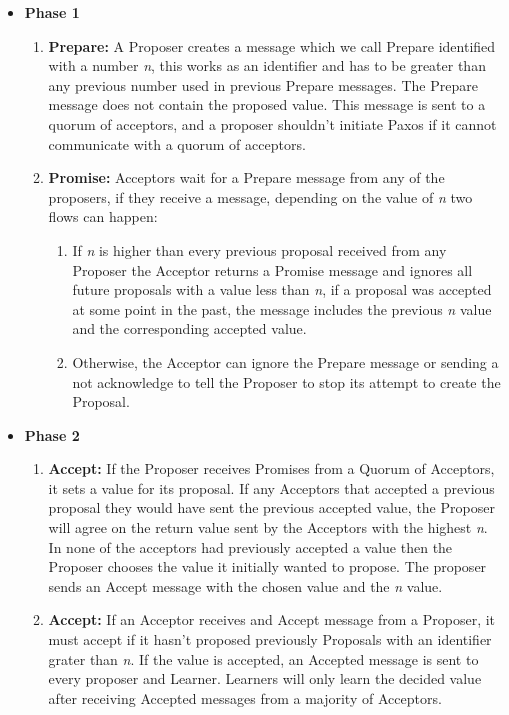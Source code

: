 \begin{itemize}
  \item \textbf{Phase 1}
  \begin{enumerate}
    \item \textbf{Prepare:} A Proposer creates a message which we call Prepare identified
with a number \textit{n}, this works as an identifier and has to be greater than
any previous number used in previous Prepare messages. The Prepare message does
not contain the proposed value. This message is sent to a quorum of acceptors, and
a proposer shouldn't initiate Paxos if it cannot communicate with a quorum of acceptors.
    \item \textbf{Promise:} Acceptors wait for a Prepare message from any of the proposers,
if they receive a message, depending on the value of \textit{n} two flows can happen:
    \begin{enumerate}
      \item If \textit{n} is higher than every previous proposal received from any Proposer
the Acceptor returns a Promise message and ignores all future proposals with a value
less than \textit{n}, if a proposal was accepted at some point in the past, the message
includes the previous \textit{n} value and the corresponding accepted value.
      \item Otherwise, the Acceptor can ignore the Prepare message or sending a not
acknowledge to tell the Proposer to stop its attempt to create the Proposal.
    \end{enumerate}
  \end{enumerate}

  \item \textbf{Phase 2}
  \begin{enumerate}
    \item \textbf{Accept:} If the Proposer receives Promises from a Quorum of Acceptors,
it sets a value for its proposal. If any Acceptors that accepted a previous proposal
they would have sent the previous accepted value, the Proposer will agree on the return
value sent by the Acceptors with the highest \textit{n}. In none of the acceptors had
previously accepted a value then the Proposer chooses the value it initially wanted to propose.
The proposer sends an Accept message with the chosen value and the \textit{n} value.
  \item \textbf{Accept:} If an Acceptor receives and Accept message from a Proposer,
it must accept if it hasn't proposed previously Proposals with an identifier grater than
\textit{n}. If the value is accepted, an Accepted message is sent to every proposer and Learner.
Learners will only learn the decided value after receiving Accepted messages from a majority
of Acceptors.
  \end{enumerate}
\end{itemize}

